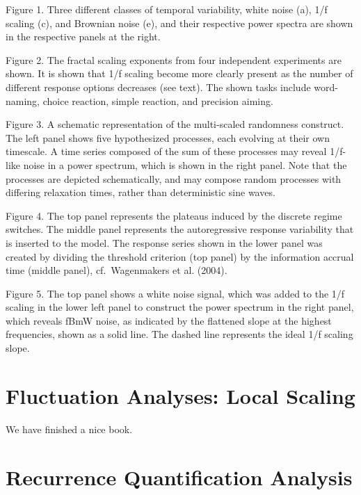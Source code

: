 \documentclass[12pt,]{book}
\begin{document}
Figure 1. Three different classes of temporal variability, white noise (a), 1/f scaling (c), and Brownian noise (e), and their respective power spectra are shown in the respective panels at the right.

Figure 2. The fractal scaling exponents from four independent experiments are shown. It is shown that 1/f scaling become more clearly present as the number of different response options decreases (see text). The shown tasks include word-naming, choice reaction, simple reaction, and precision aiming.

Figure 3. A schematic representation of the multi-scaled randomness construct. The left panel shows five hypothesized processes, each evolving at their own timescale. A time series composed of the sum of these processes may reveal 1/f-like noise in a power spectrum, which is shown in the right panel. Note that the processes are depicted schematically, and may compose random processes with differing relaxation times, rather than deterministic sine waves.

Figure 4. The top panel represents the plateaus induced by the discrete regime switches. The middle panel represents the autoregressive response variability that is inserted to the model. The response series shown in the lower panel was created by dividing the threshold criterion (top panel) by the information accrual time (middle panel), cf.~Wagenmakers et al. (2004).

Figure 5. The top panel shows a white noise signal, which was added to the 1/f scaling in the lower left panel to construct the power spectrum in the right panel, which reveals fBmW noise, as indicated by the flattened slope at the highest frequencies, shown as a solid line. The dashed line represents the ideal 1/f scaling slope.

\hypertarget{fluctuation-analyses-local-scaling}{%
\chapter{Fluctuation Analyses: Local Scaling}\label{fluctuation-analyses-local-scaling}}

We have finished a nice book.

\hypertarget{recurrence-quantification-analysis}{%
\chapter{Recurrence Quantification Analysis}\label{recurrence-quantification-analysis}}
\end{document}
